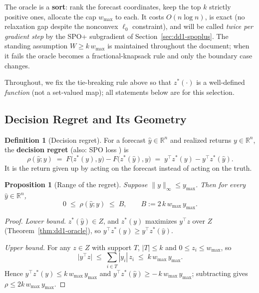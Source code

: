 \documentclass[11pt,a4paper]{article}
\theoremstyle{definition}
\newtheorem{definition}{Definition}[section]
\theoremstyle{plain}
\newtheorem{proposition}{Proposition}[section]
\newcommand{\R}{\mathbb{R}}
\begin{document}
\begin{keypoint}
The oracle is a \textbf{sort}: rank the forecast coordinates, keep the top $k$
strictly positive ones, allocate the cap $w_{\max}$ to each. It costs
$O(n \log n)$, is exact (no relaxation gap despite the nonconvex $\ell_0$
constraint), and will be called \emph{twice per gradient step} by the SPO+
subgradient of Section~\ref{sec:dd1-spoplus}. The standing assumption
$W \ge k\, w_{\max}$ is maintained throughout the document; when it fails the
oracle becomes a fractional-knapsack rule and only the boundary case changes.
\end{keypoint}

Throughout, we fix the tie-breaking rule above so that $z^*(\cdot)$ is a
well-defined \emph{function} (not a set-valued map); all statements below are
for this selection.

\subsection{Decision Regret and Its Geometry}
\label{sec:dd1-regret}

\begin{definition}[Decision regret]
\label{def:dd1-regret}
For a forecast $\hat{y} \in \R^n$ and realized returns $y \in \R^n$, the
\textbf{decision regret} (also: SPO loss \cite{elmachtoub2022smart}) is
\begin{equation}
\label{eq:dd1-regret}
\rho(\hat{y}; y) \;=\; F\bigl(z^*(y), y\bigr) - F\bigl(z^*(\hat{y}), y\bigr)
\;=\; y^\top z^*(y) - y^\top z^*(\hat{y}).
\end{equation}
It is the return given up by acting on the forecast instead of acting on the
truth.
\end{definition}

\begin{proposition}[Range of the regret]
\label{prop:dd1-regret-range}
Suppose $\|y\|_\infty \le y_{\max}$. Then for every $\hat{y} \in \R^n$,
\begin{equation}
\label{eq:dd1-B}
0 \;\le\; \rho(\hat{y}; y) \;\le\; B, \qquad B := 2\, k\, w_{\max}\, y_{\max}.
\end{equation}
\end{proposition}

\begin{proof}
\emph{Lower bound.} $z^*(\hat{y}) \in Z$, and $z^*(y)$ maximizes $y^\top z$
over $Z$ (Theorem~\ref{thm:dd1-oracle}), so
$y^\top z^*(y) \ge y^\top z^*(\hat{y})$.

\emph{Upper bound.} For any $z \in Z$ with support $T$, $|T| \le k$ and
$0 \le z_i \le w_{\max}$, so
\[
\bigl| y^\top z \bigr| \;\le\; \sum_{i \in T} |y_i|\, z_i
\;\le\; k\, w_{\max}\, y_{\max}.
\]
Hence $y^\top z^*(y) \le k\, w_{\max}\, y_{\max}$ and
$y^\top z^*(\hat{y}) \ge -\,k\, w_{\max}\, y_{\max}$; subtracting gives
$\rho \le 2 k\, w_{\max}\, y_{\max}$.
\end{proof}
\end{document}
